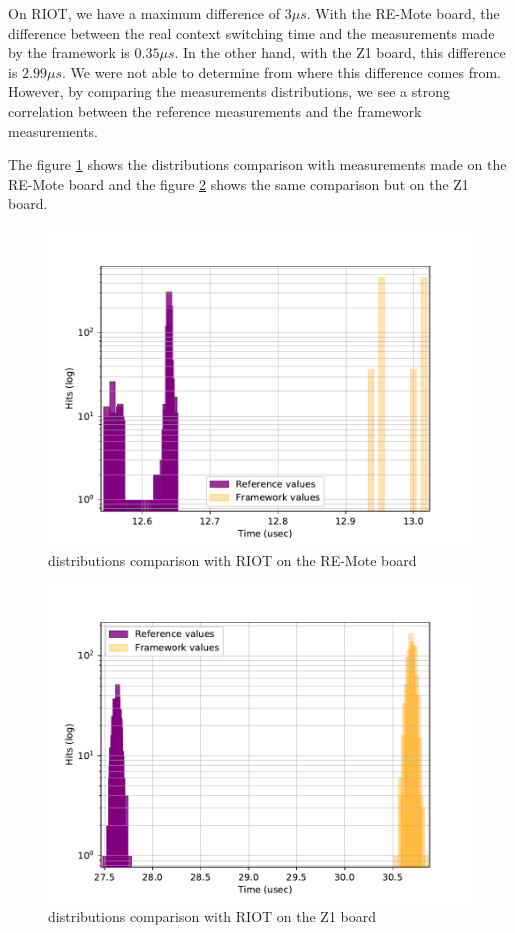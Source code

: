 On RIOT, we have a maximum difference of $3\mu s$.
With the RE-Mote board, the difference between the real context switching time and the measurements made by the framework is $0.35\mu s$.
In the other hand, with the Z1 board, this difference is $2.99\mu s$.
We were not able to determine from where this difference comes from.
However, by comparing the measurements distributions, we see a strong correlation between the reference measurements and the framework measurements.

The figure \ref{fig:devices-comparison-riot-remote} shows the distributions comparison with measurements made on the RE-Mote board and the figure \ref{fig:devices-comparison-riot-z1} shows the same comparison but on the Z1 board.

\begin{figure}[!ht]
  \centering
  \includegraphics[scale=.7]{assets/comparison-devices-framework-riot-remote.pdf}
  \caption{distributions comparison with RIOT on the RE-Mote board\label{fig:devices-comparison-riot-remote}}
\end{figure}

\begin{figure}[!ht]
  \centering
  \includegraphics[scale=.7]{assets/comparison-devices-framework-riot-z1.pdf}
  \caption{distributions comparison with RIOT on the Z1 board\label{fig:devices-comparison-riot-z1}}
\end{figure}